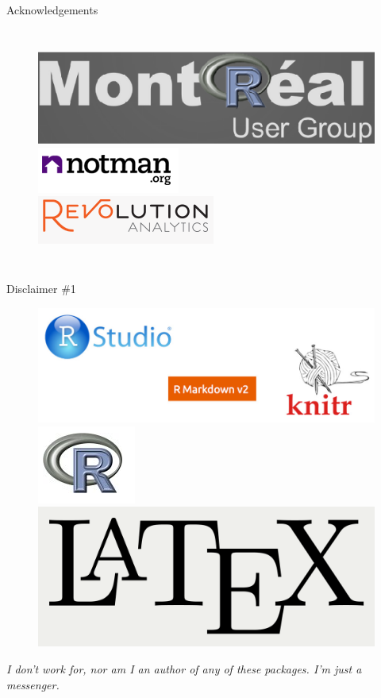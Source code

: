 \documentclass[10pt]{beamer}\usepackage[]{graphicx}\usepackage[]{color}
\begin{document}
\begin{frame}{Acknowledgements}
\begin{columns}[c]
\begin{figure}
\includegraphics[width=0.8\columnwidth]{mtluser.png}\\[5mm]
\includegraphics[width=0.8\columnwidth]{notman.png}\\[5mm]
\includegraphics[width=0.8\columnwidth]{revo.png}
\end{figure}

\end{columns}
\end{frame}


\begin{frame}{Disclaimer \#1}
\begin{figure}
\includegraphics[width=0.8\columnwidth]{rstudio.png}\\[5mm]
\includegraphics[width=0.2\columnwidth]{rlogo.png}\\[5mm]
\includegraphics[width=0.2\columnwidth]{LaTeX_logo.png}
\end{figure}

\textit{I don't work for, nor am I an author of any of these packages. I'm just a messenger.}

\end{frame}
\end{document}
